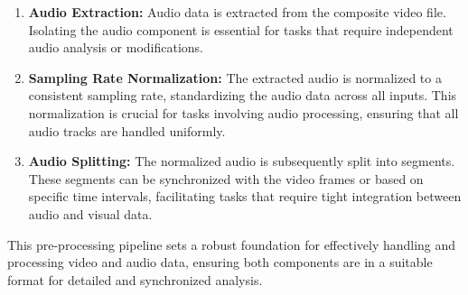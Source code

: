 \documentclass{ioereport}
\begin{document}
    \begin{enumerate}[label=\textbf{\roman*.}]
        \item \textbf{Audio Extraction:}
        Audio data is extracted from the composite video file. Isolating the audio component is essential for tasks that require independent audio analysis or modifications.
        
        \item \textbf{Sampling Rate Normalization:}
        The extracted audio is normalized to a consistent sampling rate, standardizing the audio data across all inputs. This normalization is crucial for tasks involving audio processing, ensuring that all audio tracks are handled uniformly.
        
        \item \textbf{Audio Splitting:}
        The normalized audio is subsequently split into segments. These segments can be synchronized with the video frames or based on specific time intervals, facilitating tasks that require tight integration between audio and visual data.
    \end{enumerate}
    
    This pre-processing pipeline sets a robust foundation for effectively handling and processing video and audio data, ensuring both components are in a suitable format for detailed and synchronized analysis.
\end{document}
